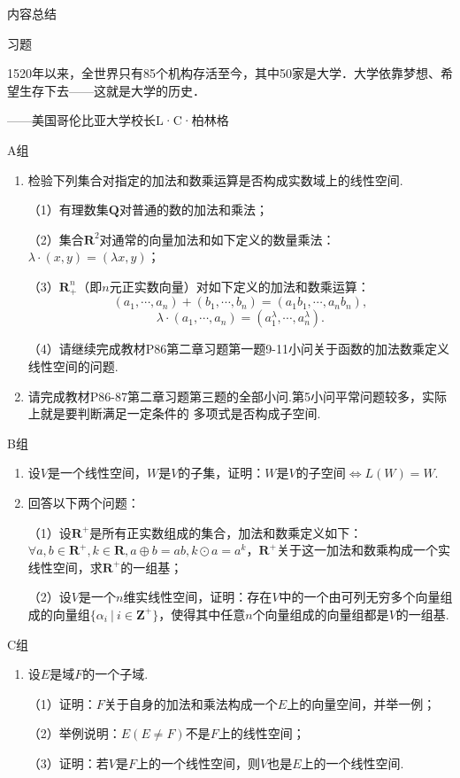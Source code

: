 \vspace{2ex}
\centerline{\heiti \Large 内容总结}

\vspace{2ex}

\centerline{\heiti \Large 习题}
\vspace{2ex}
{\kaishu 1520年以来，全世界只有85个机构存活至今，其中50家是大学．大学依靠梦想、希望生存下去——这就是大学的历史．}
\begin{flushright}
	\kaishu
	——美国哥伦比亚大学校长L·C·柏林格
\end{flushright}
\centerline{\heiti A组}
\begin{enumerate}
	\item 检验下列集合对指定的加法和数乘运算是否构成实数域上的线性空间.

	      （1）有理数集$\mathbf{Q}$对普通的数的加法和乘法；

	      （2）集合$\mathbf{R}^2$对通常的向量加法和如下定义的数量乘法：$\lambda\cdot(x,y)=(\lambda x,y)$；

	      （3）$\mathbf{R}_+^n$（即$n$元正实数向量）对如下定义的加法和数乘运算：
	      $$(a_1,\cdots,a_n)+(b_1,\cdots,b_n)=(a_1b_1,\cdots,a_nb_n),$$
	      $$\lambda\cdot(a_1,\cdots,a_n)=(a_1^\lambda,\cdots,a_n^\lambda).$$

	      （4）请继续完成教材P86第二章习题第一题9-11小问关于函数的加法数乘定义线性空间的问题.
	\item 请完成教材P86-87第二章习题第三题的全部小问.第5小问平常问题较多，实际上就是要判断满足一定条件的
	      多项式是否构成子空间.
\end{enumerate}
\centerline{\heiti B组}
\begin{enumerate}
	\item 设$V$是一个线性空间，$W$是$V$的子集，证明：$W$是$V$的子空间$\iff L(W)=W$.
	\item 回答以下两个问题：

	      （1）设$\mathbf{R}^+$是所有正实数组成的集合，加法和数乘定义如下：$\forall a,b \in \mathbf{R}^+,k\in \mathbf{R},a\oplus b = ab, k\odot a = a^k$，$\mathbf{R}^+$关于这一加法和数乘构成一个实线性空间，求$\mathbf{R}^+$的一组基；

	      （2）设$V$是一个$n$维实线性空间，证明：存在$V$中的一个由可列无穷多个向量组成的向量组$\{\alpha_i\ |\ i\in\mathbf{Z}^+\}$，使得其中任意$n$个向量组成的向量组都是$V$的一组基.
\end{enumerate}
\centerline{\heiti C组}
\begin{enumerate}
	\item 设$E$是域$F$的一个子域.

	      （1）证明：$F$关于自身的加法和乘法构成一个$E$上的向量空间，并举一例；

	      （2）举例说明：$E(E\neq F)$不是$F$上的线性空间；

	      （3）证明：若$V$是$F$上的一个线性空间，则$V$也是$E$上的一个线性空间.
\end{enumerate}